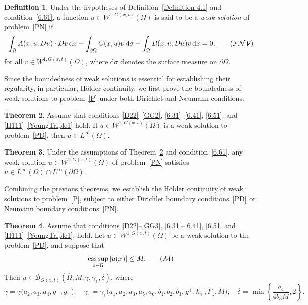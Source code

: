 \documentclass[10pt,reqno]{amsart}
\newcommand *\w{^\wedge}
\theoremstyle{definition}
\newtheorem{theorem}{Theorem}[section]
\newtheorem{definition}[theorem]{Definition}
\numberwithin{equation}{section}
\begin{document}
\begin{definition}\label{Definition 4.1w}
Under the hypotheses of Definition~\ref{Definition 4.1} and condition~\eqref{6.61}, a function \( u \in W^{1,G(x,t)}(\Omega) \) is said to be a \emph{weak solution} of problem~\eqref{PN} if
\begin{equation}\label{FNV}
\int_{\Omega} A(x, u, Du) \cdot Dv \, \mathrm{d}x - \int_{\partial\Omega} C(x, u)v \, \mathrm{d}\sigma - \int_{\Omega} B(x, u, Du) v \, \mathrm{d}x = 0, \tag{$\mathcal{FNV}$}
\end{equation}
for all \( v \in W^{1,G(x,t)}(\Omega) \), where \( \mathrm{d}\sigma \) denotes the surface measure on \( \partial\Omega \).
\end{definition}

Since the boundedness of weak solutions is essential for establishing their regularity, in particular, Hölder continuity, we first prove the boundedness of weak solutions to problem~\eqref{P} under both Dirichlet and Neumann conditions.

\begin{theorem}\label{Theorem 4.1w}
Assume that conditions \eqref{D22}--\eqref{GG2}, \eqref{6.31}--\eqref{6.41}, \eqref{6.51}, and \eqref{H111}--\eqref{YoungTriple1} hold. If \( u \in W^{1,G(x,t)}(\Omega) \) is a weak solution to problem~\eqref{PD}, then \( u \in L^{\infty}(\Omega) \).
\end{theorem}
\begin{theorem}\label{Theorem 6.1w}
Under the assumptions of Theorem~\ref{Theorem 4.1w} and condition~\eqref{6.61}, any weak solution \( u \in W^{1,G(x,t)}(\Omega) \) of problem~\eqref{PN} satisfies \( u \in L^{\infty}(\Omega) \cap L^{\infty}(\partial\Omega) \).
\end{theorem}
Combining the previous theorems, we establish the Hölder continuity of weak solutions to problem~\eqref{P}, subject to either Dirichlet boundary conditions~\eqref{PD} or Neumann boundary conditions~\eqref{PN}.
\begin{theorem}\label{Theorem 4.2}
Assume that conditions \eqref{D22}--\eqref{GG3}, \eqref{6.31}--\eqref{6.41}, \eqref{6.51} and \eqref{H111}--\eqref{YoungTriple1}, hold. Let \( u \in W^{1,G(x,t)}(\Omega) \) be a weak solution to the problem~\eqref{PD}, and suppose that
\begin{equation}\label{M}
\mathop{\mathrm{ess\,sup}}_{x \in \Omega} |u(x)| \leq M. \tag{$\mathcal{M}$}
\end{equation}
Then \( u \in \mathcal{B}_{G(x,t)}(\overline{\Omega}, M, \gamma, \gamma_1, \delta) \), where
\[
\gamma = \gamma\big(a_2, a_3, a_4, g^-, g^+\big), \quad
\gamma_1 = \gamma_1\big(a_1,a_2, a_3, a_5,a_6, b_1,b_2,b_3, g^+,h^+_1,F_1,M\big), \quad
\delta = \min\left\{ \frac{a_4}{4 b_3M}, 2 \right\}.
\]
\end{theorem}
\end{document}
